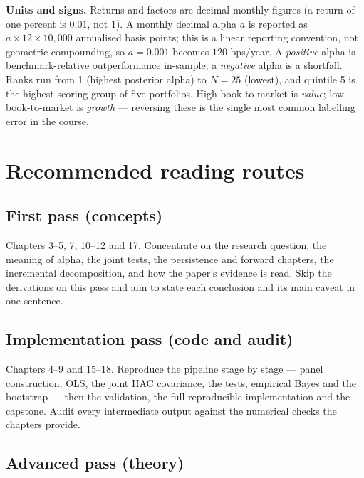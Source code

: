 \textbf{Units and signs.} Returns and factors are decimal monthly figures
(a return of one percent is $0.01$, not $1$). A monthly decimal alpha $a$
is reported as $a\times 12\times 10{,}000$ annualised basis points; this
is a linear reporting convention, not geometric compounding, so
$a=0.001$ becomes $120$ bps/year. A \emph{positive} alpha is
benchmark-relative outperformance in-sample; a \emph{negative} alpha is a
shortfall. Ranks run from 1 (highest posterior alpha) to $N=25$ (lowest),
and quintile 5 is the highest-scoring group of five portfolios. High
book-to-market is \emph{value}; low book-to-market is \emph{growth} ---
reversing these is the single most common labelling error in the course.

\hypertarget{recommended-reading-routes}{%
\section{Recommended reading routes}\label{recommended-reading-routes}}

\hypertarget{first-pass}{%
\subsection{First pass (concepts)}\label{first-pass}}

Chapters 3--5, 7, 10--12 and 17. Concentrate on the research question, the
meaning of alpha, the joint tests, the persistence and forward chapters,
the incremental decomposition, and how the paper's evidence is read.
Skip the derivations on this pass and aim to state each conclusion and
its main caveat in one sentence.

\hypertarget{implementation-pass}{%
\subsection{Implementation pass (code and
audit)}\label{implementation-pass}}

Chapters 4--9 and 15--18. Reproduce the pipeline stage by stage --- panel
construction, OLS, the joint HAC covariance, the tests, empirical Bayes
and the bootstrap --- then the validation, the full reproducible
implementation and the capstone. Audit every intermediate output against
the numerical checks the chapters provide.

\hypertarget{advanced-pass}{%
\subsection{Advanced pass (theory)}\label{advanced-pass}}

